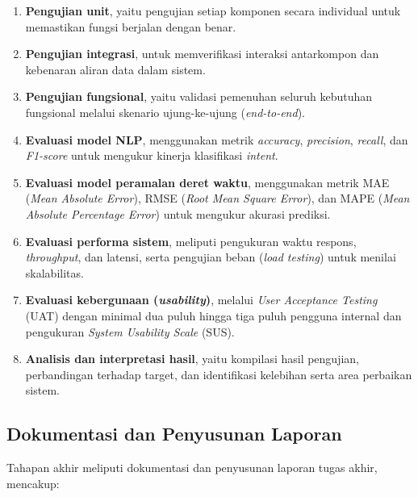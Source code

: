 \begin{enumerate}[label=\alph*.]
  \item \textbf{Pengujian unit}, yaitu pengujian setiap komponen secara individual untuk memastikan fungsi berjalan dengan benar.
  
  \item \textbf{Pengujian integrasi}, untuk memverifikasi interaksi antarkompon dan kebenaran aliran data dalam sistem.
  
  \item \textbf{Pengujian fungsional}, yaitu validasi pemenuhan seluruh kebutuhan fungsional melalui skenario ujung-ke-ujung (\textit{end-to-end}).
  
  \item \textbf{Evaluasi model NLP}, menggunakan metrik \textit{accuracy}, \textit{precision}, \textit{recall}, dan \textit{F1-score} untuk mengukur kinerja klasifikasi \textit{intent}.
  
  \item \textbf{Evaluasi model peramalan deret waktu}, menggunakan metrik MAE (\textit{Mean Absolute Error}), RMSE (\textit{Root Mean Square Error}), dan MAPE (\textit{Mean Absolute Percentage Error}) untuk mengukur akurasi prediksi.
  
  \item \textbf{Evaluasi performa sistem}, meliputi pengukuran waktu respons, \textit{throughput}, dan latensi, serta pengujian beban (\textit{load testing}) untuk menilai skalabilitas.
  
  \item \textbf{Evaluasi kebergunaan (\textit{usability})}, melalui \textit{User Acceptance Testing} (UAT) dengan minimal dua puluh hingga tiga puluh pengguna internal dan pengukuran \textit{System Usability Scale} (SUS).
  
  \item \textbf{Analisis dan interpretasi hasil}, yaitu kompilasi hasil pengujian, perbandingan terhadap target, dan identifikasi kelebihan serta area perbaikan sistem.
\end{enumerate}

\subsection{Dokumentasi dan Penyusunan Laporan}

Tahapan akhir meliputi dokumentasi dan penyusunan laporan tugas akhir, mencakup:

